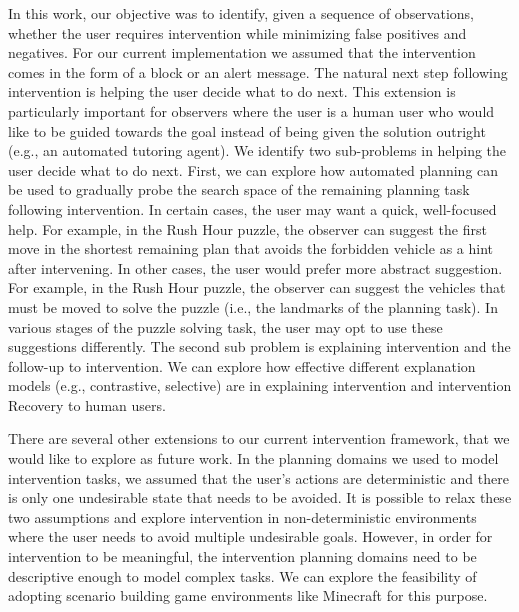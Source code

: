 In this work, our objective was to identify, given a sequence of observations, whether the user requires intervention while minimizing false positives and negatives. 
For our current implementation we assumed that the intervention comes in the form of a block or an alert message. 
The natural next step following intervention is helping the user decide what to do next. 
This extension is particularly important for observers where the user is a human user who would like to be guided towards the goal instead of being given the solution outright (e.g., an automated tutoring agent). 
We identify two sub-problems in helping the user decide what to do next. 
First, we can explore how automated planning can be used to gradually probe the search space of the remaining planning task following intervention. 
In certain cases, the user may want a quick, well-focused help. 
For example, in the Rush Hour puzzle, the observer can suggest the first move in the shortest remaining plan that avoids the forbidden vehicle as a hint after intervening. 
In other cases, the user would prefer more abstract suggestion. 
For example, in the Rush Hour puzzle, the observer can suggest the vehicles that must be moved to solve the puzzle (i.e., the landmarks of the planning task). 
In various stages of the puzzle solving task, the user may opt to use these suggestions differently. 
The second sub problem is explaining intervention and the follow-up to intervention. 
We can explore how effective different explanation models (e.g., contrastive, selective) are in explaining intervention and intervention Recovery to human users.

There are several other extensions to our current intervention framework, that we would like to explore as future work. 
In the planning domains we used to model intervention tasks, we assumed that the user's actions are deterministic and there is only one undesirable state that needs to be avoided. 
It is possible to relax these two assumptions and explore intervention in non-deterministic environments where the user needs to avoid multiple undesirable goals. 
However, in order for intervention to be meaningful, the intervention planning domains need to be descriptive enough to model complex tasks. 
We can explore the feasibility of adopting scenario building game environments like Minecraft for this purpose.
